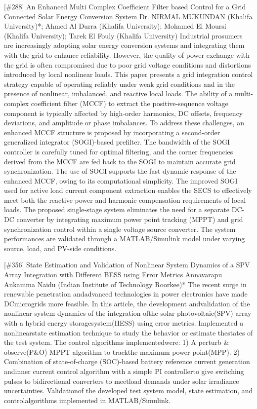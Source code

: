 {} \begin{abstract_online} {[\#288] An Enhanced Multi Complex Coefficient Filter based Control for a Grid Connected Solar Energy Conversion System} {} {Dr. NIRMAL MUKUNDAN (Khalifa University)*; Ahmed  Al Durra (Khalifa University); Mohamed  El Moursi (Khalifa University); Tarek  El Fouly (Khalifa University)} {} Industrial prosumers are increasingly adopting solar energy conversion systems and integrating them with the grid to enhance reliability. However, the quality of power exchange with the grid is often compromised due to poor grid voltage conditions and distortions introduced by local nonlinear loads. This paper presents a grid integration control strategy capable of operating reliably under weak grid conditions and in the presence of nonlinear, imbalanced, and reactive local loads. The ability of a multi-complex coefficient filter (MCCF) to extract the positive-sequence voltage component is typically affected by high-order harmonics, DC offsets, frequency deviations, and amplitude or phase imbalances. To address these challenges, an enhanced MCCF structure is proposed by incorporating a second-order generalized integrator (SOGI)-based prefilter. The bandwidth of the SOGI controller is carefully tuned for optimal filtering, and the corner frequencies derived from the MCCF are fed back to the SOGI to maintain accurate grid synchronization. The use of SOGI supports the fast dynamic response of the enhanced MCCF, owing to its computational simplicity. The improved SOGI used for active load current component extraction enables the SECS to effectively meet both the reactive power and harmonic compensation requirements of local loads. The proposed single-stage system eliminates the need for a separate DC-DC converter by integrating maximum power point tracking (MPPT) and grid synchronization control within a single voltage source converter. The system performances are validated through a MATLAB/Simulink model under varying source, load, and PV-side conditions. \end{abstract_online} 
{} \begin{abstract_online} {[\#356] State Estimation and Validation of Nonlinear System Dynamics of a SPV Array Integration with Different BESS using Error Metrics} {} {Annavarapu Ankamma Naidu (Indian Institute of Technology Roorkee)*} {} The recent surge in renewable penetration andadvanced technologies in power electronics have made DCmicrogrids more feasible. In this article, the development andvalidation of the nonlinear system dynamics of the integration ofthe solar photovoltaic(SPV) array with a hybrid energy storagesystem(HESS) using error metrics. Implemented a nonlinearstate estimation technique to study the behavior or estimate thestates of the test system. The control algorithms implementedwere: 1) A perturb \& observe(P\&O) MPPT algorithm to trackthe maximum power point(MPP). 2) Combination of state-of-charge (SOC)-based battery reference current generation andinner current control algorithm with a simple PI controllerto give switching pulses to bidirectional converters to meetload demands under solar irradiance uncertainties. Validationof the developed test system model, state estimation, and controlalgorithms implemented in MATLAB/Simulink. \end{abstract_online} 
